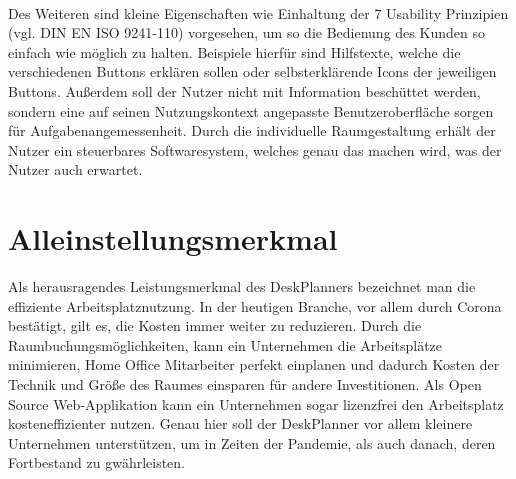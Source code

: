 \paragraph{} Des Weiteren sind kleine Eigenschaften wie Einhaltung der 7 Usability Prinzipien (vgl. DIN EN ISO 9241-110) vorgesehen, um so die Bedienung des Kunden so einfach wie möglich zu halten. 
Beispiele hierfür sind Hilfstexte, welche die verschiedenen Buttons erklären sollen oder selbsterklärende Icons der jeweiligen Buttons. 
Außerdem soll der Nutzer nicht mit Information beschüttet werden, sondern eine auf seinen Nutzungskontext angepasste Benutzeroberfläche sorgen für Aufgabenangemessenheit. 
Durch die individuelle Raumgestaltung erhält der Nutzer ein steuerbares Softwaresystem, welches genau das machen wird, was der Nutzer auch erwartet.

\section{Alleinstellungsmerkmal}
Als herausragendes Leistungsmerkmal des DeskPlanners bezeichnet man die effiziente Arbeitsplatznutzung. 
In der heutigen Branche, vor allem durch Corona bestätigt, gilt es, die Kosten immer weiter zu reduzieren. 
Durch die Raumbuchungsmöglichkeiten, kann ein Unternehmen die Arbeitsplätze minimieren, Home Office Mitarbeiter perfekt einplanen und dadurch Kosten der Technik und Größe des Raumes einsparen für andere Investitionen. 
Als Open Source Web-Applikation kann ein Unternehmen sogar lizenzfrei den Arbeitsplatz kosteneffizienter nutzen.
Genau hier soll der DeskPlanner vor allem kleinere Unternehmen unterstützen, um in Zeiten der Pandemie, als auch danach, deren Fortbestand zu gwährleisten.

